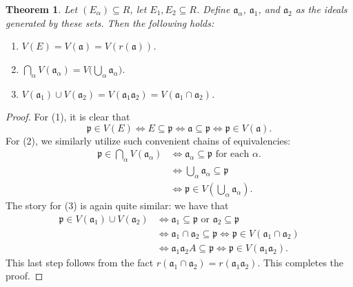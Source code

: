 \documentclass[11pt]{article}
\newtheorem{theorem}{Theorem}
\begin{document}
\begin{adjustwidth}{0.5cm}{}
  \begin{theorem}
    Let $(E_{\alpha}) \subseteq R$, let $E_{1}, E_{2} \subseteq R$. Define $\mathfrak{a}_{\alpha}$, $\mathfrak{a}_{1}$, and $\mathfrak{a}_{2}$ as the ideals generated by these sets. Then the following holds:
    \begin{enumerate}
      \item $V(E) = V(\mathfrak{a}) = V(r(\mathfrak{a}))$.
      \item $\bigcap\limits_{\alpha} V(\mathfrak{a}_{\alpha}) = V \big( \bigcup\limits_{\alpha} \mathfrak{a}_{\alpha} \big)$.
      \item $V(\mathfrak{a}_{1}) \cup V(\mathfrak{a}_{2}) = V(\mathfrak{a}_{1}\mathfrak{a}_{2}) = V(\mathfrak{a}_{1} \cap \mathfrak{a}_{2})$.
    \end{enumerate}
  \end{theorem}
  \begin{proof}
    For (1), it is clear that
    \[
      \mathfrak{p} \in V(E) \iff E \subseteq \mathfrak{p} \iff \mathfrak{a} \subseteq \mathfrak{p} \iff \mathfrak{p} \in V(\mathfrak{a}).
    \]
    For (2), we similarly utilize such convenient chains of equivalencies:
    \begin{align*}
      \mathfrak{p} \in \bigcap\limits_{\alpha} V(\mathfrak{a}_{\alpha}) & \iff \mathfrak{a}_{\alpha} \subseteq \mathfrak{p} \text{ for each } \alpha. \\
                                                             & \iff \bigcup\limits_{\alpha} \mathfrak{a}_{\alpha} \subseteq \mathfrak{p} \\
                                                             & \iff \mathfrak{p} \in V \left( \bigcup\limits_{\alpha} \mathfrak{a}_{\alpha} \right).
    \end{align*}
    The story for (3) is again quite similar: we have that
    \begin{align*}
      \mathfrak{p} \in V(\mathfrak{a}_{1}) \cup V(\mathfrak{a}_{2}) &\iff \mathfrak{a}_{1} \subseteq \mathfrak{p} \text{ or } \mathfrak{a}_{2} \subseteq \mathfrak{p} \\
                                                                                        &\iff \mathfrak{a}_{1} \cap \mathfrak{a}_{2} \subseteq \mathfrak{p} \iff \mathfrak{p} \in V(\mathfrak{a}_{1} \cap \mathfrak{a}_{2}) \\
                                                                                                                                                                                & \iff \mathfrak{a}_{1}\mathfrak{a}_{2}A \subseteq \mathfrak{p} \iff \mathfrak{p} \in V(\mathfrak{a}_{1}\mathfrak{a}_{2}).
    \end{align*}
    This last step follows from the fact $r(\mathfrak{a}_{1} \cap \mathfrak{a}_{2}) = r(\mathfrak{a}_{1}\mathfrak{a}_{2})$. This completes the proof. 
  \end{proof}
\end{adjustwidth}
\end{document}
